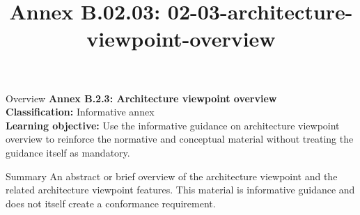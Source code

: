 \documentclass[10pt,letterpaper]{article}
\title{Annex B.02.03: 02-03-architecture-viewpoint-overview}
\author{}
\date{}
\begin{document}
\maketitle
\begin{CornellOverviewBox}{Overview}
{\Large\bfseries\textcolor{CNavy}{Annex B.2.3: Architecture viewpoint overview}}\\[3pt]
{\small\textbf{Classification:} Informative annex}\\
{\small\textbf{Learning objective:} Use the informative guidance on architecture viewpoint overview to reinforce the normative and conceptual material without treating the guidance itself as mandatory.}
\end{CornellOverviewBox}
\vspace{3pt}

\begin{CornellNotesTable}
\end{CornellNotesTable}


\begin{CornellSummaryBox}{Summary}
An abstract or brief overview of the architecture viewpoint and the related architecture viewpoint features. This material is informative guidance and does not itself create a conformance requirement.
\end{CornellSummaryBox}
\end{document}
